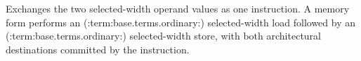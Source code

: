 Exchanges the two selected-width operand values as one instruction. A memory form performs an (:term:base.terms.ordinary:) selected-width load followed by an (:term:base.terms.ordinary:) selected-width store, with both architectural destinations committed by the instruction.
